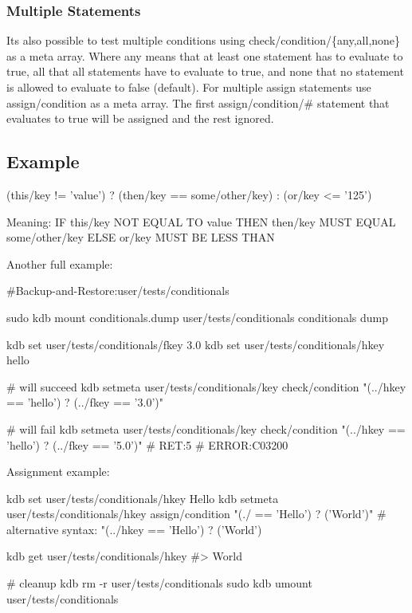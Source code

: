 \subsubsection*{Multiple Statements}

It\textquotesingle{}s also possible to test multiple conditions using {\ttfamily check/condition/\{any,all,none\}} as a meta array. Where {\ttfamily any} means that at least one statement has to evaluate to true, {\ttfamily all} that all statements have to evaluate to true, and {\ttfamily none} that no statement is allowed to evaluate to false (default). For multiple assign statements use {\ttfamily assign/condition} as a meta array. The first {\ttfamily assign/condition/\#} statement that evaluates to true will be assigned and the rest ignored.

\subsection*{Example}


\begin{DoxyCode}
(this/key  != 'value') ? (then/key == some/other/key) : (or/key <= '125')
\end{DoxyCode}


Meaning\+: IF {\ttfamily this/key} N\+OT E\+Q\+U\+AL TO {\ttfamily \textquotesingle{}value\textquotesingle{}} T\+H\+EN {\ttfamily then/key} M\+U\+ST E\+Q\+U\+AL {\ttfamily some/other/key} E\+L\+SE {\ttfamily or/key} M\+U\+ST BE L\+E\+SS T\+H\+AN {}

Another full example\+:


\begin{DoxyCode}
#Backup-and-Restore:user/tests/conditionals

sudo kdb mount conditionals.dump user/tests/conditionals conditionals dump

kdb set user/tests/conditionals/fkey 3.0
kdb set user/tests/conditionals/hkey hello

# will succeed
kdb setmeta user/tests/conditionals/key check/condition "(../hkey == 'hello') ? (../fkey == '3.0')"

# will fail
kdb setmeta user/tests/conditionals/key check/condition "(../hkey == 'hello') ? (../fkey == '5.0')"
# RET:5
# ERROR:C03200
\end{DoxyCode}


Assignment example\+:


\begin{DoxyCode}
kdb set user/tests/conditionals/hkey Hello
kdb setmeta user/tests/conditionals/hkey assign/condition "(./ == 'Hello') ? ('World')"
# alternative syntax: "(../hkey == 'Hello') ? ('World')

kdb get user/tests/conditionals/hkey
#> World

# cleanup
kdb rm -r user/tests/conditionals
sudo kdb umount user/tests/conditionals
\end{DoxyCode}


